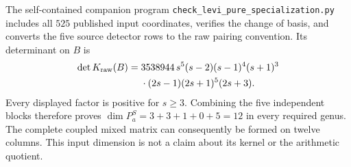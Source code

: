 The self-contained companion program
\texttt{check\_levi\_pure\_specialization.py}
includes all $525$ published input coordinates, verifies the
change of basis, and converts the five source detector rows
to the raw pairing convention. Its determinant on $B$ is
\[
\begin{aligned}
 \det K_{\rm raw}(B)
  ={}&3538944\,s^5(s-2)(s-1)^4(s+1)^3\\
    &\cdot(2s-1)(2s+1)^5(2s+3).
\end{aligned}
\]
Every displayed factor is positive for $s\geq3$. Combining the
five independent blocks therefore proves
$\dim P_a^S=3+3+1+0+5=12$ in every required genus.
The complete coupled mixed matrix can consequently be formed
on twelve columns. This input dimension is not a claim about
its kernel or the arithmetic quotient.

